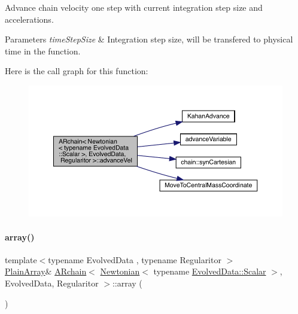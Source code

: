 Advance chain velocity one step with current integration step size and accelerations. 
\begin{DoxyParams}{Parameters}
{\em time\+Step\+Size} & Integration step size, will be transfered to physical time in the function. \\
\hline
\end{DoxyParams}
Here is the call graph for this function\+:\nopagebreak
\begin{figure}[H]
\begin{center}
\leavevmode
\includegraphics[width=350pt]{class_a_rchain_3_01_newtonian_3_01typename_01_evolved_data_1_1_scalar_01_4_00_01_evolved_data_00_01_regularitor_01_4_ad11d21617228157e755aa334d9c621a7_cgraph}
\end{center}
\end{figure}
\mbox{\label{class_a_rchain_3_01_newtonian_3_01typename_01_evolved_data_1_1_scalar_01_4_00_01_evolved_data_00_01_regularitor_01_4_a919d200a913f75719c7240c030b9b113}} 
\paragraph{\texorpdfstring{array()}{array()}}
{\footnotesize\ttfamily template$<$typename Evolved\+Data , typename Regularitor $>$ \\
\mbox{\hyperlink{class_a_rchain_3_01_newtonian_3_01typename_01_evolved_data_1_1_scalar_01_4_00_01_evolved_data_00_01_regularitor_01_4_a8cf940df8dabb6c78662f839c2b13c9a}{Plain\+Array}}\& \mbox{\hyperlink{class_a_rchain}{A\+Rchain}}$<$ \mbox{\hyperlink{class_newtonian}{Newtonian}}$<$ typename \mbox{\hyperlink{class_a_rchain_a707e42a79e4744424a34c9007e84ee07}{Evolved\+Data\+::\+Scalar}} $>$, Evolved\+Data, Regularitor $>$\+::array (\begin{DoxyParamCaption}{ }\end{DoxyParamCaption})\hspace{0.3cm}{\ttfamily [inline]}}



